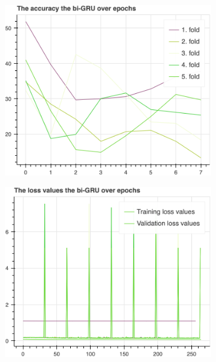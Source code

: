 		\begin{figure}[H]\ContinuedFloat
			\begin{subfigure}[b]{0.49\textwidth}
				\centering
				\includegraphics[width=\textwidth]{img/bi-GRU-accuracy.png}
			\end{subfigure}
			\hfill
			\begin{subfigure}[b]{0.49\textwidth}
				\centering
				\includegraphics[width=\textwidth]{img/bi-GRU-loss_values.png}
			\end{subfigure}
		\end{figure}
